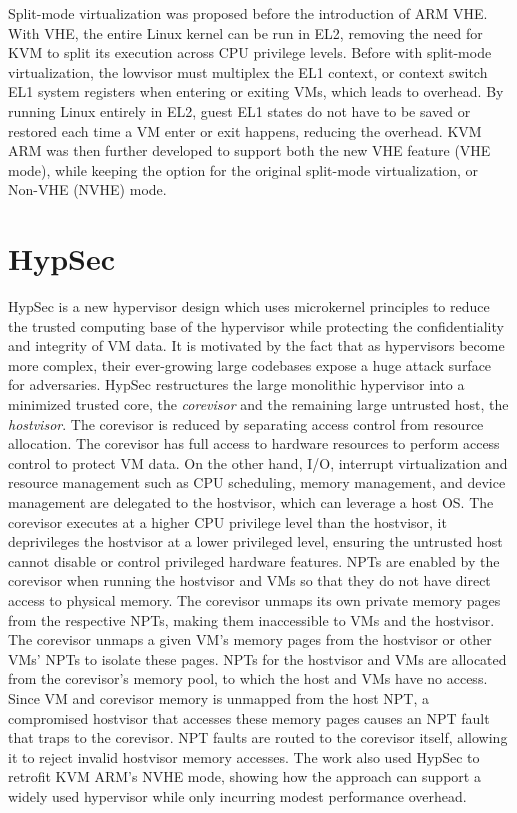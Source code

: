 Split-mode virtualization was proposed before the introduction of ARM VHE. With
VHE, the entire Linux kernel can be run in EL2, removing the need for KVM to
split its execution across CPU privilege levels. Before with split-mode
virtualization, the lowvisor must multiplex the EL1 context, or context switch
EL1 system registers when entering or exiting VMs, which leads to overhead. By
running Linux entirely in EL2, guest EL1 states do not have to be saved or
restored each time a VM enter or exit happens, reducing the overhead. KVM ARM
was then further developed to support both the new VHE feature (VHE mode),
while keeping the option for the original split-mode virtualization, or Non-VHE
(NVHE) mode.

\section{HypSec}

HypSec \cite{hypsec} is a new hypervisor design which uses microkernel principles to reduce
the trusted computing base of the hypervisor while protecting the
confidentiality and integrity of VM data. It is motivated by the fact that as
hypervisors become more complex, their ever-growing large codebases expose a
huge attack surface for adversaries. HypSec restructures the large monolithic
hypervisor into a minimized trusted core, the \textit{corevisor} and the
remaining large untrusted host, the \textit{hostvisor}.
The corevisor is reduced by separating access control from resource allocation.
The corevisor has full access to hardware resources to perform access control
to protect VM data.
On the other hand, I/O, interrupt virtualization and resource management such
as CPU scheduling, memory management, and device management are delegated to
the hostvisor, which can leverage a host OS.
The corevisor executes at a higher CPU privilege level than the hostvisor,
it deprivileges the hostvisor at a lower privileged level, ensuring
the untrusted host cannot disable or control privileged hardware features.
NPTs are enabled by the corevisor when running the hostvisor and VMs so that
they do not have direct access to physical memory.
The corevisor unmaps its own private memory pages from the respective NPTs,
making them inaccessible to VMs and the hostvisor. The corevisor unmaps a given
VM's memory pages from the hostvisor or other VMs' NPTs to isolate these pages.
NPTs for the hostvisor and VMs are allocated from the corevisor's memory pool,
to which the host and VMs have no access. Since VM and corevisor memory is
unmapped from the host NPT, a compromised hostvisor that accesses these memory
pages causes an NPT fault that traps to the corevisor. NPT faults are routed to
the corevisor itself, allowing it to reject invalid hostvisor memory accesses.
The work also used HypSec to retrofit KVM ARM's NVHE mode, showing how the
approach can support a widely used hypervisor while only incurring modest
performance overhead.

